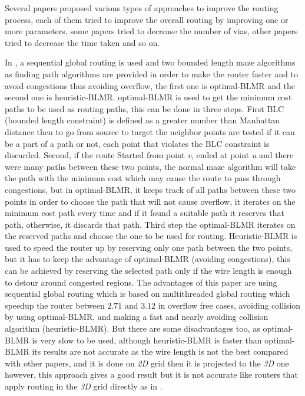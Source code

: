 \documentclass[conference]{IEEEtran}
\begin{document}
Several papers proposed various types of approaches to improve the routing process, each of them tried to improve the overall routing by improving one or more parameters, some papers tried to decrease the number of vias, other papers tried to decrease the time taken and so on.
\medskip
\par
In \cite{b1}, a sequential global routing is used and two bounded length maze algorithms as finding path algorithms are provided in order to make the router faster and to avoid congestions thus avoiding overflow, the first one is optimal-BLMR and the second one is heuristic-BLMR. optimal-BLMR is used to get the minimum cost paths to be used as routing paths, this can be done in three steps. First BLC (bounded length constraint) is defined as a greater number than Manhattan distance then to go from source to target the neighbor points are tested if it can be a part of a path or not, each point that violates the BLC constraint is discarded. Second, if the route Started from point \textit{v}, ended at point \textit{u} and there were many paths between these two points, the normal maze algorithm will take the path with the minimum cost which may cause the route to pass through congestions, but in optimal-BLMR, it keeps track of all paths between these two points in order to choose the path that will not cause overflow, it iterates on the minimum cost path every time and if it found a suitable path it reserves that path, otherwise, it discards that path. Third step the optimal-BLMR iterates on the reserved paths and choose the one to be used for routing. Heuristic-BLMR is used to speed the router up by reserving only one path between the two points, but it has to keep the advantage of optimal-BLMR (avoiding congestions), this can be achieved by reserving the selected path only if the wire length is enough to detour around congested regions. The advantages of this paper are using sequential global routing which is based on multithreaded global routing which speedup the router between $2.71$ and $3.12$ in overflow free cases, avoiding collision by using optimal-BLMR, and making a fast and nearly avoiding collision algorithm (heuristic-BLMR). But there are some disadvantages too, as optimal-BLMR is very slow to be used, although heuristic-BLMR is faster than optimal-BLMR its results are not accurate as the wire length is not the best compared with other papers, and it is done on \textit{2D} grid then it is projected to the \textit{3D} one however, this approach gives a good result but it is not accurate like routers that apply routing in the \textit{3D} grid directly as in \cite{b9}.
\end{document}
